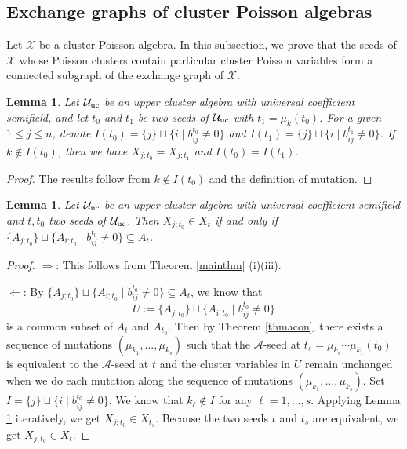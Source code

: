 \documentclass{amsart}
\newtheorem{lemma}[theorem]{Lemma}
\theoremstyle{definition}
\theoremstyle{remark}
\numberwithin{equation}{section}
\begin{document}
\subsection{Exchange graphs of cluster Poisson algebras}\label{sec72}

Let $\mathcal X$ be a cluster Poisson algebra. In this subsection, we prove that  the  seeds of  $\mathcal X$ whose Poisson clusters contain particular cluster Poisson variables form a connected subgraph of the exchange graph of $\mathcal X$.



\begin{lemma}\label{lemxi}
Let $\mathcal U_{\rm uc}$ be an upper cluster algebra with universal coefficient semifield, and let $t_0$ and $t_1$ be two seeds of $\mathcal U_{\rm uc}$ with $t_1=\mu_k(t_0)$. For a given $1\leq j\leq n$, denote $I(t_0)=\{j\}\sqcup\{i\mid b_{ij}^{t_0}\neq 0\}$ and $I(t_1)=\{j\}\sqcup\{i\mid b_{ij}^{t_1}\neq 0\}$. If
$k\notin I(t_0)$, then we have $X_{j;t_0}=X_{j;t_1}$ and $I(t_0)=I(t_1)$.
\end{lemma}
\begin{proof}
The results follow from $k\notin I(t_0)$ and the definition of mutation.
\end{proof}

\begin{lemma}\label{lemiff}
Let $\mathcal U_{\rm uc}$ be an upper cluster algebra with universal coefficient semifield and $t, t_0$  two seeds of $\mathcal U_{\rm uc}$. Then $X_{j;t_0}\in X_{t}$ if and only if
$\{A_{j;t_0}\}\sqcup\{A_{i;t_0}\mid  b_{ij}^{t_0}\neq 0\}\subseteq A_{t}$.
\end{lemma}
\begin{proof}
$\Longrightarrow$: This follows from Theorem \ref{mainthm} (i)(iii).


$\Longleftarrow$: By $\{A_{j;t_0}\}\sqcup\{A_{i;t_0}\mid  b_{ij}^{t_0}\neq 0\}\subseteq A_{t}$, we know that $$U:=\{A_{j;t_0}\}\sqcup\{A_{i;t_0}\mid  b_{ij}^{t_0}\neq 0\}$$ is a common subset of $A_t$ and $A_{t_0}$. Then by Theorem \ref{thmacon}, there exists a  sequence of mutations $(\mu_{k_1},\ldots,\mu_{k_s})$ such that the $\mathscr A$-seed at $t_s=\mu_{k_s}\cdots\mu_{k_1}(t_0)$ is equivalent to the $\mathscr A$-seed at $t$ and the cluster variables in $U$ remain unchanged when we do each mutation along the sequence of mutations $(\mu_{k_1},\ldots,\mu_{k_s})$. Set $I=\{j\}\sqcup\{i\mid b_{ij}^{t_0}\neq 0\}$. We know that $k_{\ell}\notin I$ for any $\ell=1,\ldots,s$. Applying Lemma \ref{lemxi} iteratively, we get $X_{j;t_0}\in X_{t_s}$. Because the two seeds $t$ and $t_s$ are equivalent,  we get $X_{j;t_0}\in X_t$.
\end{proof}
\end{document}
